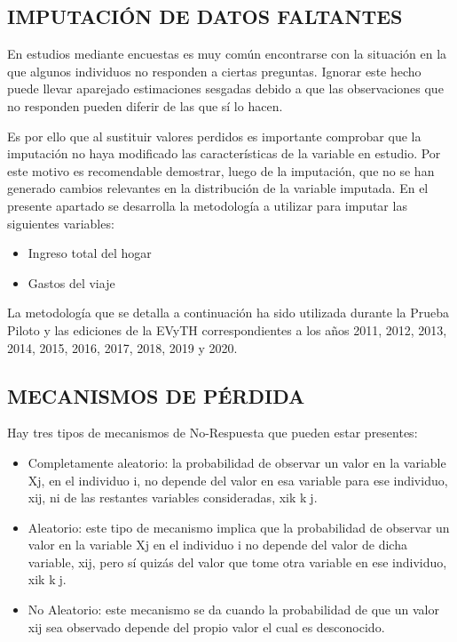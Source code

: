 \documentclass[
  openany]{book}
\begin{document}
\hypertarget{imputaciuxf3n-de-datos-faltantes}{%
\subsection{\texorpdfstring{\textbf{IMPUTACIÓN DE DATOS FALTANTES}}{IMPUTACIÓN DE DATOS FALTANTES}}\label{imputaciuxf3n-de-datos-faltantes}}

En estudios mediante encuestas es muy común encontrarse con la situación en la que algunos individuos no responden a ciertas preguntas. Ignorar este hecho puede llevar aparejado estimaciones sesgadas debido a que las observaciones que no responden pueden diferir de las que sí lo hacen.

Es por ello que al sustituir valores perdidos es importante comprobar que la imputación no haya modificado las características de la variable en estudio. Por este motivo es recomendable demostrar, luego de la imputación, que no se han generado cambios relevantes en la distribución de la variable imputada. En el presente apartado se desarrolla la metodología a utilizar para imputar las siguientes variables:

\begin{itemize}
\item
  Ingreso total del hogar
\item
  Gastos del viaje
\end{itemize}

La metodología que se detalla a continuación ha sido utilizada durante la Prueba Piloto y las ediciones de la EVyTH correspondientes a los años 2011, 2012, 2013, 2014, 2015, 2016, 2017, 2018, 2019 y 2020.

\hypertarget{mecanismos-de-puxe9rdida}{%
\subsection{\texorpdfstring{\textbf{MECANISMOS DE PÉRDIDA}}{MECANISMOS DE PÉRDIDA}}\label{mecanismos-de-puxe9rdida}}

Hay tres tipos de mecanismos de No-Respuesta que pueden estar presentes:

\begin{itemize}
\item
  Completamente aleatorio: la probabilidad de observar un valor en la variable Xj, en el individuo i, no depende del valor en esa variable para ese individuo, xij, ni de las restantes variables consideradas, xik kj.
\item
  Aleatorio: este tipo de mecanismo implica que la probabilidad de observar un valor en la variable Xj en el individuo i no depende del valor de dicha variable, xij, pero sí quizás del valor que tome otra variable en ese individuo, xik kj.
\item
  No Aleatorio: este mecanismo se da cuando la probabilidad de que un valor xij sea observado depende del propio valor el cual es desconocido.
\end{itemize}
\end{document}
